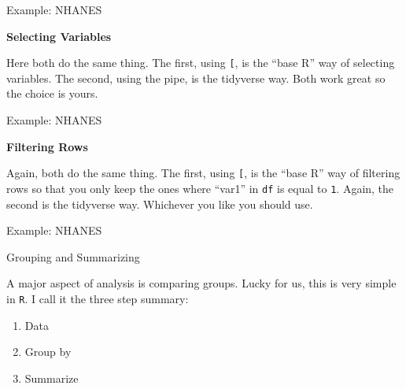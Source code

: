 \begin{frame}[fragile]{Example: NHANES}

\textbf{Selecting Variables}

\begin{Shaded}
\end{Shaded}

Here both do the same thing. The first, using \texttt{{[}}, is the
``base R'' way of selecting variables. The second, using the pipe, is
the tidyverse way. Both work great so the choice is yours.

\end{frame}

\begin{frame}[fragile]{Example: NHANES}

\textbf{Filtering Rows}

\begin{Shaded}
\end{Shaded}

Again, both do the same thing. The first, using \texttt{{[}}, is the
``base R'' way of filtering rows so that you only keep the ones where
``var1'' in \texttt{df} is equal to \texttt{1}. Again, the second is the
tidyverse way. Whichever you like you should use.

\end{frame}

\begin{frame}[fragile]{Example: NHANES}

\begin{block}{Grouping and Summarizing}

A major aspect of analysis is comparing groups. Lucky for us, this is
very simple in \texttt{R}. I call it the three step summary:

\begin{enumerate}
\def\labelenumi{\arabic{enumi}.}
\tightlist
\item
  Data
\item
  Group by
\item
  Summarize
\end{enumerate}

\end{block}

\end{frame}

